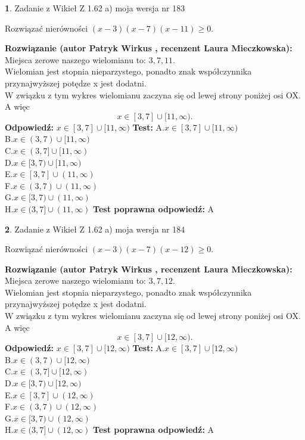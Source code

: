 \documentclass[12pt, a4paper]{article}
\theoremstyle{definition} %
\newtheorem{zad}{}
\newcommand{\zadStart}[1]{\begin{zad}#1\newline}
\newcommand{\zadStop}{\end{zad}}
\newcommand{\rozwStart}[2]{\noindent \textbf{Rozwiązanie (autor #1 , recenzent #2): }\newline}
\newcommand{\rozwStop}{\newline}
\newcommand{\odpStart}{\noindent \textbf{Odpowiedź:}\newline}
\newcommand{\odpStop}{\newline}
\newcommand{\testStart}{\noindent \textbf{Test:}\newline}
\newcommand{\testStop}{\newline}
\newcommand{\kluczStart}{\noindent \textbf{Test poprawna odpowiedź:}\newline}
\newcommand{\kluczStop}{\newline}
\begin{document}
\zadStart{Zadanie z Wikieł Z 1.62 a) moja wersja nr 183}

Rozwiązać nierówności $(x-3)(x-7)(x-11)\ge0$.
\zadStop
\rozwStart{Patryk Wirkus}{Laura Mieczkowska}
Miejsca zerowe naszego wielomianu to: $3, 7, 11$.\\
Wielomian jest stopnia nieparzystego, ponadto znak współczynnika przy\linebreak najwyższej potędze x jest dodatni.\\ W związku z tym wykres wielomianu zaczyna się od lewej strony poniżej osi OX. A więc $$x \in [3,7] \cup [11,\infty).$$
\rozwStop
\odpStart
$x \in [3,7] \cup [11,\infty)$
\odpStop
\testStart
A.$x \in [3,7] \cup [11,\infty)$\\
B.$x \in (3,7) \cup [11,\infty)$\\
C.$x \in (3,7] \cup [11,\infty)$\\
D.$x \in [3,7) \cup [11,\infty)$\\
E.$x \in [3,7] \cup (11,\infty)$\\
F.$x \in (3,7) \cup (11,\infty)$\\
G.$x \in [3,7) \cup (11,\infty)$\\
H.$x \in (3,7] \cup (11,\infty)$
\testStop
\kluczStart
A
\kluczStop



\zadStart{Zadanie z Wikieł Z 1.62 a) moja wersja nr 184}

Rozwiązać nierówności $(x-3)(x-7)(x-12)\ge0$.
\zadStop
\rozwStart{Patryk Wirkus}{Laura Mieczkowska}
Miejsca zerowe naszego wielomianu to: $3, 7, 12$.\\
Wielomian jest stopnia nieparzystego, ponadto znak współczynnika przy\linebreak najwyższej potędze x jest dodatni.\\ W związku z tym wykres wielomianu zaczyna się od lewej strony poniżej osi OX. A więc $$x \in [3,7] \cup [12,\infty).$$
\rozwStop
\odpStart
$x \in [3,7] \cup [12,\infty)$
\odpStop
\testStart
A.$x \in [3,7] \cup [12,\infty)$\\
B.$x \in (3,7) \cup [12,\infty)$\\
C.$x \in (3,7] \cup [12,\infty)$\\
D.$x \in [3,7) \cup [12,\infty)$\\
E.$x \in [3,7] \cup (12,\infty)$\\
F.$x \in (3,7) \cup (12,\infty)$\\
G.$x \in [3,7) \cup (12,\infty)$\\
H.$x \in (3,7] \cup (12,\infty)$
\testStop
\kluczStart
A
\kluczStop
\end{document}
